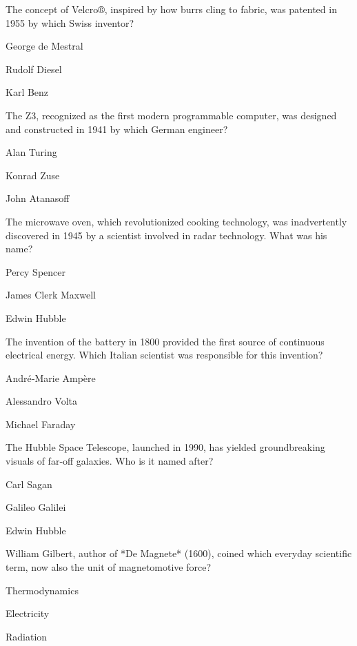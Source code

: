 \begin{enhancedmcq}{The concept of Velcro®, inspired by how burrs cling to fabric, was patented in 1955 by which Swiss inventor?}
\item George de Mestral
\item Rudolf Diesel
\item Karl Benz

\end{enhancedmcq}
\begin{enhancedmcq}{The Z3, recognized as the first modern programmable computer, was designed and constructed in 1941 by which German engineer?}
\item Alan Turing
\item Konrad Zuse
\item John Atanasoff

\end{enhancedmcq}
\begin{enhancedmcq}{The microwave oven, which revolutionized cooking technology, was inadvertently discovered in 1945 by a scientist involved in radar technology. What was his name?}
\item Percy Spencer
\item James Clerk Maxwell
\item Edwin Hubble

\end{enhancedmcq}
\begin{enhancedmcq}{The invention of the battery in 1800 provided the first source of continuous electrical energy. Which Italian scientist was responsible for this invention?}
\item André‑Marie Ampère
\item Alessandro Volta
\item Michael Faraday

\end{enhancedmcq}
\begin{enhancedmcq}{The Hubble Space Telescope, launched in 1990, has yielded groundbreaking visuals of far‑off galaxies. Who is it named after?}
\item Carl Sagan
\item Galileo Galilei
\item Edwin Hubble

\end{enhancedmcq}
\begin{enhancedmcq}{William Gilbert, author of *De Magnete* (1600), coined which everyday scientific term, now also the unit of magnetomotive force?}
\item Thermodynamics
\item Electricity
\item Radiation

\end{enhancedmcq}
